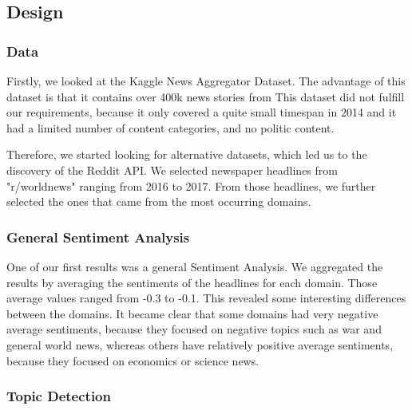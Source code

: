 \documentclass[final]{ieee}
\begin{document}
\subsection{Design}


\subsubsection{Data}
Firstly, we looked at the Kaggle News Aggregator Dataset\cite{Lichman13}. The advantage of this dataset is that it contains over 400k news stories from 
This dataset did not fulfill our requirements, because it only covered a quite small timespan in 2014 and it had a limited number of content categories, and no politic content.

Therefore, we started looking for alternative datasets, which led us to the discovery of the Reddit API. We selected newspaper headlines from "r/worldnews" ranging from 2016 to 2017. From those headlines, we further selected the ones that came from the most occurring domains. %

\subsubsection{General Sentiment Analysis}

One of our first results was a general Sentiment Analysis. %
We aggregated the results by averaging the sentiments of the headlines for each domain. Those average values ranged from -0.3 to -0.1. %
This revealed some interesting differences between the domains. It became clear that some domains had very negative average sentiments, because they focused on negative topics such as war and general world news, whereas others have relatively positive average sentiments, because they focused on economics or science news. %

\subsubsection{Topic Detection}
\end{document}
